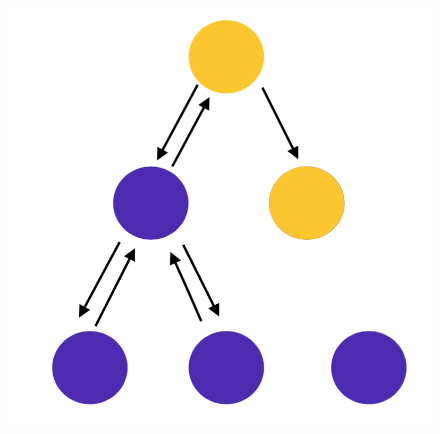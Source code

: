 \documentclass[10pt,a4paper]{article}
\begin{document}
\begin{figure}[h!]
\begin{minipage}{.3\textwidth}
  \includegraphics[width=.8\linewidth]{images/di-sch6.png}
  \label{fig:di-sch6}
\end{minipage}
\end{figure} 
\end{document}
